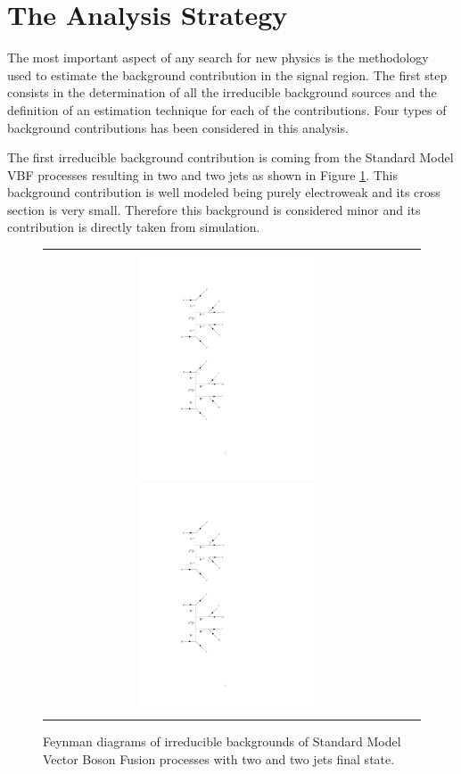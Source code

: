 \section{The Analysis Strategy}

The most important aspect of any search for new physics is the methodology used to estimate the background contribution in the signal region. The first step consists in the determination of all the irreducible background sources and the definition of an estimation technique for each of the contributions. Four types of background contributions has been considered in this analysis. 

The first irreducible background contribution is coming from the Standard Model VBF processes resulting in two \hadtau and two jets as shown in Figure \ref{fig:background_SMVBF}. This background contribution is well modeled being purely electroweak and its cross section is very small. Therefore this background is considered minor and its contribution is directly taken from simulation.

\begin{figure}[tbh!]
	\centering
	\begin{tabular}{cc}
		\includegraphics[width=0.50\textwidth]{diagrams/pics/background_SMVBFminus.pdf}
		\includegraphics[width=0.50\textwidth]{diagrams/pics/background_SMVBFplus.pdf} 		
	\end{tabular}
	\caption{Feynman diagrams of irreducible backgrounds of Standard Model Vector Boson Fusion processes with two \hadtau and two jets final state. }
	\label{fig:background_SMVBF}
\end{figure}

